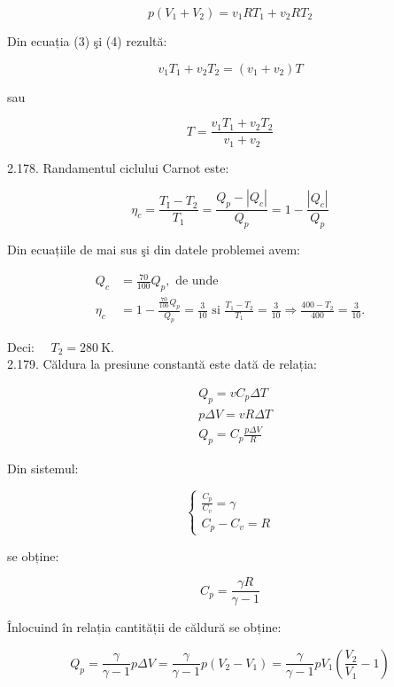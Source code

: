 \documentclass[10pt]{article}
\begin{document}
\begin{equation*}
p\left(V_{1}+V_{2}\right)=v_{1} R T_{1}+v_{2} R T_{2} \tag{4}
\end{equation*}


Din ecuația (3) şi (4) rezultă:


\begin{equation*}
v_{1} T_{1}+v_{2} T_{2}=\left(v_{1}+v_{2}\right) T \tag{5}
\end{equation*}


sau

$$
T=\frac{v_{1} T_{1}+v_{2} T_{2}}{v_{1}+v_{2}}
$$

2.178. Randamentul ciclului Carnot este:

$$
\eta_{c}=\frac{T_{\mathrm{I}}-T_{2}}{T_{1}}=\frac{Q_{p}-\left|Q_{c}\right|}{Q_{p}}=1-\frac{\left|Q_{c}\right|}{Q_{p}}
$$

Din ecuațiile de mai sus şi din datele problemei avem:

$$
\begin{aligned}
Q_{c} & =\frac{70}{100} Q_{p}, \text { de unde } \\
\eta_{c} & =1-\frac{\frac{70}{100} Q_{p}}{Q_{p}}=\frac{3}{10} \text { si } \frac{T_{1}-T_{2}}{T_{1}}=\frac{3}{10} \Rightarrow \frac{400-T_{2}}{400}=\frac{3}{10} .
\end{aligned}
$$

Deci: $\quad T_{2}=280 \mathrm{~K}$.\\
2.179. Căldura la presiune constantă este dată de relația:

$$
\begin{aligned}
& Q_{p}=v C_{p} \Delta T \\
& p \Delta V=v R \Delta T \\
& Q_{p}=C_{p} \frac{p \Delta V}{R}
\end{aligned}
$$

Din sistemul:

$$
\left\{\begin{array}{l}
\frac{C_{p}}{C_{v}}=\gamma \\
C_{p}-C_{v}=R
\end{array}\right.
$$

se obține:

$$
C_{p}=\frac{\gamma R}{\gamma-1}
$$

Înlocuind în relația cantității de căldură se obține:

$$
Q_{p}=\frac{\gamma}{\gamma-1} p \Delta V=\frac{\gamma}{\gamma-1} p\left(V_{2}-V_{1}\right)=\frac{\gamma}{\gamma-1} p V_{1}\left(\frac{V_{2}}{V_{1}}-1\right)
$$
\end{document}
